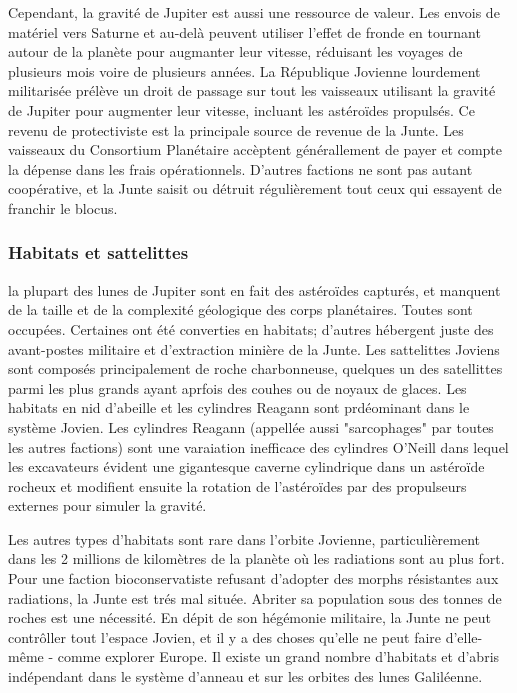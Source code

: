                                                                Cependant, la gravité de Jupiter est aussi une ressource de valeur. Les envois de matériel vers Saturne et au-delà peuvent utiliser l'effet de fronde en tournant autour de la planète pour augmanter leur vitesse, réduisant les voyages de plusieurs mois voire de plusieurs années. La République Jovienne lourdement militarisée prélève un droit de passage sur tout les vaisseaux utilisant la gravité de Jupiter pour augmenter leur vitesse, incluant les astéroïdes propulsés. Ce revenu de protectiviste est la principale source de revenue de la Junte. Les vaisseaux du Consortium Planétaire accèptent générallement de payer et compte la dépense dans les frais opérationnels. D'autres factions ne sont pas autant coopérative, et la Junte saisit ou détruit régulièrement tout ceux qui essayent de franchir le blocus. 

                                                               \subsubsection{Habitats et sattelittes} \label{sec:habitats-moonlets} 

                                                               la plupart des lunes de Jupiter sont en fait des astéroïdes capturés, et manquent de la taille et de la complexité géologique des corps planétaires. Toutes sont occupées. Certaines ont été converties en habitats; d'autres hébergent juste des avant-postes militaire et d'extraction minière de la Junte. Les sattelittes Joviens sont composés principalement de roche charbonneuse, quelques un des satellittes parmi les plus grands ayant aprfois des couhes ou de noyaux de glaces. Les habitats en nid d'abeille et les cylindres Reagann sont prdéominant dans le système Jovien. Les cylindres Reagann (appellée aussi "sarcophages" par toutes les autres factions) sont une varaiation inefficace des cylindres O'Neill dans lequel les excavateurs évident une gigantesque caverne cylindrique dans un astéroïde rocheux et modifient ensuite la rotation de l'astéroïdes par des propulseurs externes pour simuler la gravité. 

                                                               Les autres types d'habitats sont rare dans l'orbite Jovienne, particulièrement dans les 2 millions de kilomètres de la planète où les radiations sont au plus fort. Pour une faction bioconservatiste refusant d'adopter des morphs résistantes aux radiations, la Junte est trés mal située. Abriter sa population sous des tonnes de roches est une nécessité. En dépit de son hégémonie militaire, la Junte ne peut contrôller tout l'espace Jovien, et il y a des choses qu'elle ne peut faire d'elle-même - comme explorer Europe. Il existe un grand nombre d'habitats et d'abris indépendant dans le système d'anneau et sur les orbites des lunes Galiléenne. 

